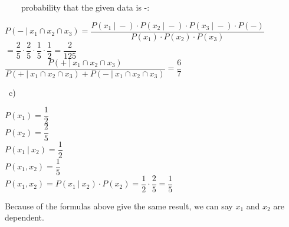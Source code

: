 \documentclass{article}
\begin{document}
\ \ \ \ probability that the given data is -: \\

{\centering

  $P(-\ | \ x_1 \cap x_2 \cap x_3) = \dfrac{P(x_1\ | \ -) \cdot P(x_2\ | \ -) \cdot P(x_3\ | \ -) \cdot P(-)}{P(x_1) \cdot P(x_2) \cdot P(x_3)}$ \\ 

  $ = \dfrac{2}{5} \cdot \dfrac{2}{5} \cdot \dfrac{1}{5} \cdot \dfrac{1}{2} = \dfrac{2}{
  125}$ \\

  $\dfrac{P(+\ | \ x_1 \cap x_2 \cap x_3)}{P(+\ | \ x_1 \cap x_2 \cap x_3) + P(-\ | \ x_1 \cap x_2 \cap x_3)} = \dfrac{6}{7}$ \par
}


\ c) 

{\centering
	$P(x_1) = \dfrac{1}{2}$ \\
	$P(x_2) = \dfrac{2}{5}$ \\
	$P(x_1\ | \ x_2) = \dfrac{1}{2}$ \\
	$P(x_1, x_2) = \dfrac{1}{5}$ \\

	$P(x_1, x_2) = P(x_1\ | \ x_2) \cdot P(x_2) = \dfrac{1}{2} \cdot \dfrac{2}{5} = \dfrac{1}{5}$

	Because of the formulas above give the same result, we can say $x_1$ and $x_2$ are dependent.
	\par
}
\end{document}
